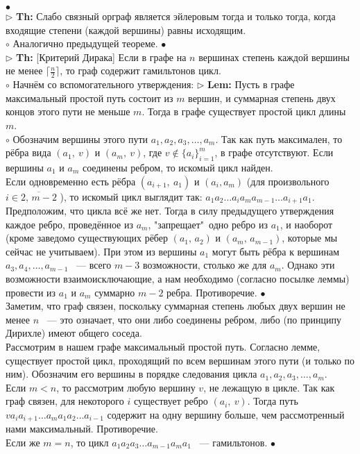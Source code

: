 \documentclass[a4paper]{article}
\begin{document}
$\bullet$ \\ 
$\triangleright$ \textbf{Th:}  Слабо связный орграф является эйлеровым тогда и только тогда, когда входящие степени (каждой вершины) равны исходящим.
\\
$\circ$  Аналогично предыдущей теореме.
$\bullet$ \\ 
$\triangleright$ \textbf{Th:} [Критерий Дирака] Если в графе на $n$ вершинах степень каждой вершины не менее $\lceil \frac{n}{2} \rceil$, то граф содержит гамильтонов цикл.
\\
$\circ$  Начнём со вспомогательного утверждения:
$\triangleright$ \textbf{Lem:} Пусть в графе максимальный простой путь состоит из $m$ вершин, и суммарная степень двух концов этого пути не меньше $m$. Тогда в графе существует простой цикл длины $m$.
\\
$\circ$  Обозначим вершины этого пути $a_1,a_2,a_3,\dots,a_m$. Так как путь максимален, то рёбра вида $(a_1,\:v)$ и $(a_m,\:v)$, где $v \notin \{a_i\}_{i=1}^m$, в графе отсутствуют. 
Если вершины $a_1$ и $a_m$ соединены ребром, то искомый цикл найден.\\
Если одновременно есть рёбра $(a_{i+1},\:a_1)$ и $(a_i,a_m)$ (для произвольного $ i \in \overline{2,\, m-2} $ ), то искомый цикл выглядит так: $a_1a_2\dots a_ia_ma_{m-1}\dots a_{i+1} a_1$.
Предположим, что цикла всё же нет. Тогда в силу предыдущего утверждения каждое ребро, проведённое из $a_m$, "запрещает"\ одно ребро из $a_1$, и наоборот (кроме заведомо существующих рёбер $(a_1,\,a_2)$ и $(a_m,\,a_{m-1})$, которые мы сейчас не учитываем). При этом из вершины $a_1$ могут быть рёбра к вершинам $a_3,a_4,\dots,a_{m-1}$ ~--- всего $m-3$ возможности, столько же для $a_m$. Однако эти возможности взаимоисключающие, а нам необходимо (согласно посылке леммы) провести из $a_1$ и $a_m$ суммарно $m-2$ ребра. Противоречие.
$\bullet$ \\ 
Заметим, что граф связен, поскольку суммарная степень любых двух вершин не менее $n$ ~--- это означает, что они либо соединены ребром, либо (по принципу Дирихле) имеют общего соседа.\\
Рассмотрим в нашем графе максимальный простой путь. Согласно лемме, существует простой цикл, проходящий по всем вершинам этого пути (и только по ним). Обозначим его вершины в порядке следования цикла $a_1,a_2,a_3,\dots ,a_m$.\\
Если $m<n$, то рассмотрим любую вершину $v$, не лежащую в цикле. Так как граф связен, для некоторого $i$ существует ребро $(a_i,\:v)$. Тогда путь $va_ia_{i+1}\dots a_ma_1a_2\dots a_{i-1}$ содержит на одну вершину больше, чем рассмотренный нами максимальный. Противоречие.\\
Если же $m=n$, то цикл $a_1a_2a_3\dots a_{m-1}a_ma_1$ ~--- гамильтонов.
$\bullet$ \\ 
\end{document}
